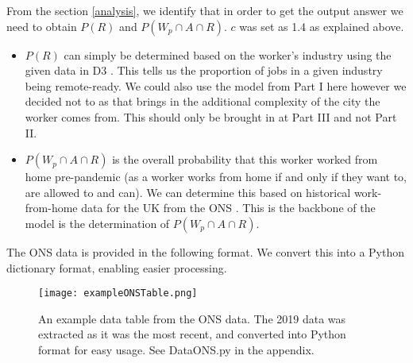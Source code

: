 

            From the section \ref{analysis}, we identify that in order to get the output answer we need to obtain $P(R)$ and $P(W_p \cap A \cap R)$. $c$ was set as 1.4 as explained above.
           \begin{itemize}
               \item $P(R)$ can simply be determined based on the worker's industry using the given data in D3 \cite{given_data}. This tells us the proportion of jobs in a given industry being remote-ready. We could also use the model from Part I here however we decided not to as that brings in the additional complexity of the city the worker comes from. This should only be brought in at Part III and not Part II.
               \item $P(W_p \cap A \cap R)$ is the overall probability that this worker worked from home pre-pandemic (as a worker works from home if and only if they want to, are allowed to and can). We can determine this based on historical work-from-home data for the UK from the ONS \cite{ONS2}. This is the backbone of the model is the determination of $P(W_p \cap A \cap R)$. 
           \end{itemize}
           
           The ONS data \cite{ONS2} is provided in the following format. We convert this into a Python dictionary format, enabling easier processing.
            \begin{figure}[H]
              \texttt{[image: exampleONSTable.png]}
              \caption{An example data table from the ONS data. The 2019 data was extracted as it was the most recent, and converted into Python format for easy usage. See DataONS.py in the appendix.}
              \label{fig:ONSTable}
            \end{figure}
            
